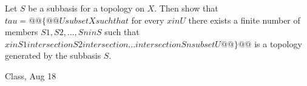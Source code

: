 \begin{samepage}
\begin{ex}
Let $S$ be a subbasis for a topology on $X$. Then show that 
\\ $tau = @@\{@@ U subset X such that $ for every $ x in U $ there exists a finite number of members $ S1, S2, ..., Sn in S $ such that $ x in S1 intersection S2 intersection ... intersection Sn subset U @@\}@@$ is a topology generated by the subbasis $S$.
\end{ex}
\begin{source}
Class, Aug 18
\end{source}
\end{samepage}
